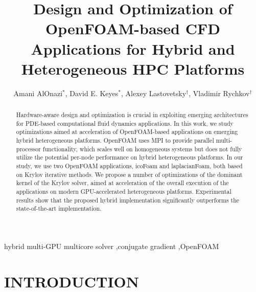 \documentclass[3p,times]{elsarticle}
\begin{document}
\begin{frontmatter}







\title{Design and Optimization of OpenFOAM-based CFD Applications for Hybrid and Heterogeneous HPC Platforms}



\author{Amani AlOnazi$^{*}$, David E. Keyes$^{*}$, Alexey Lastovetsky$^{\dag}$, Vladimir Rychkov$^{\dag}$}

\address{$^{*}$Extreme Computing Research Center, KAUST, Thuwal 23955-6900, Saudi Arabia, \\
e-mail: \{amani.alonazi, david.keyes\}@kaust.edu.sa\\
$^{\dag}$Heterogeneous Computing Laboratory, UCD, Dublin 4, Ireland, \\
e-mail:\{alexey.lastovetsky, vladimir.rychkov\}@ucd.ie}

\begin{abstract}
Hardware-aware design and optimization is crucial in exploiting emerging architectures for PDE-based computational fluid dynamics applications. In this work, we study optimizations aimed at acceleration of OpenFOAM-based applications on emerging hybrid heterogeneous platforms. OpenFOAM uses MPI to provide parallel multi-processor functionality, which scales well on homogeneous systems but does not fully utilize the potential per-node performance on hybrid heterogeneous platforms. In our study, we use two OpenFOAM applications, icoFoam and laplacianFoam, both based on Krylov iterative methods. We propose a number of optimizations of the dominant kernel of the Krylov solver, aimed at acceleration of the overall execution of the applications on modern GPU-accelerated heterogeneous platforms. Experimental results show that the proposed hybrid implementation significantly outperforms the state-of-the-art implementation.


\end{abstract}

\begin{keyword}
hybrid multi-GPU multicore solver \sep conjugate gradient \sep OpenFOAM




\end{keyword}

\end{frontmatter}



\section{INTRODUCTION}
\label{INTRODUCTION}
\end{document}
